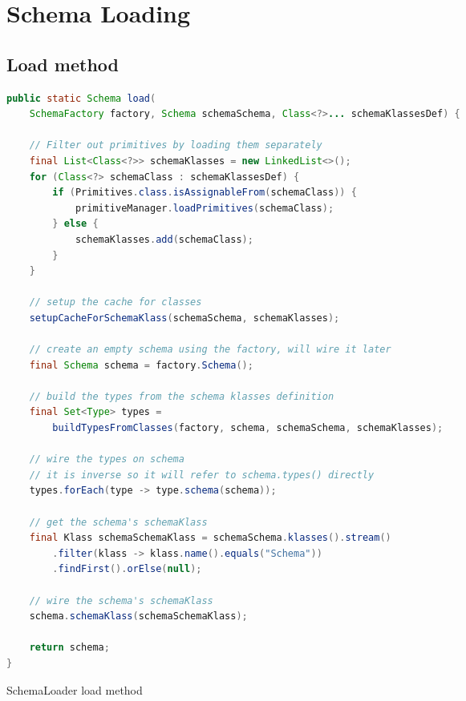 
\chapter{Schema Loading}\label{appdx:SchemaLoading}

\section{Load method}

\begin{sourcecode} [H]
	\begin{lstlisting}[language=Java, escapechar=|]
public static Schema load(
	SchemaFactory factory, Schema schemaSchema, Class<?>... schemaKlassesDef) {

	// Filter out primitives by loading them separately
	final List<Class<?>> schemaKlasses = new LinkedList<>();
	for (Class<?> schemaClass : schemaKlassesDef) {
		if (Primitives.class.isAssignableFrom(schemaClass)) {
			primitiveManager.loadPrimitives(schemaClass);
		} else {
			schemaKlasses.add(schemaClass);
		}
	}

	// setup the cache for classes
	setupCacheForSchemaKlass(schemaSchema, schemaKlasses);

	// create an empty schema using the factory, will wire it later
	final Schema schema = factory.Schema();

	// build the types from the schema klasses definition
	final Set<Type> types = 
		buildTypesFromClasses(factory, schema, schemaSchema, schemaKlasses);

	// wire the types on schema
	// it is inverse so it will refer to schema.types() directly
	types.forEach(type -> type.schema(schema));

	// get the schema's schemaKlass
	final Klass schemaSchemaKlass = schemaSchema.klasses().stream()
		.filter(klass -> klass.name().equals("Schema"))
		.findFirst().orElse(null);

	// wire the schema's schemaKlass
	schema.schemaKlass(schemaSchemaKlass);

	return schema;
}
	\end{lstlisting}
	\caption{SchemaLoader load method}
	\label{lst:SchemaLoader_load}
\end{sourcecode}

